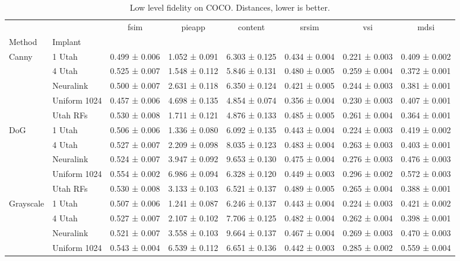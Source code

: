 \begin{table}
\caption{Low level fidelity on COCO. Distances, lower is better.}
\label{tab:low_coco}
\begin{tabular}{llcccccc}
\toprule
 &  & fsim & pieapp & content & srsim & vsi & mdsi \\
Method & Implant &  &  &  &  &  &  \\
\midrule
\multirow[t]{5}{*}{Canny} & 1 Utah & 0.499 ± 0.006 & 1.052 ± 0.091 & 6.303 ± 0.125 & 0.434 ± 0.004 & 0.221 ± 0.003 & 0.409 ± 0.002 \\
 & 4 Utah & 0.525 ± 0.007 & 1.548 ± 0.112 & 5.846 ± 0.131 & 0.480 ± 0.005 & 0.259 ± 0.004 & 0.372 ± 0.001 \\
 & Neuralink & 0.500 ± 0.007 & 2.631 ± 0.118 & 6.350 ± 0.124 & 0.421 ± 0.005 & 0.244 ± 0.003 & 0.381 ± 0.001 \\
 & Uniform 1024 & 0.457 ± 0.006 & 4.698 ± 0.135 & 4.854 ± 0.074 & 0.356 ± 0.004 & 0.230 ± 0.003 & 0.407 ± 0.001 \\
 & Utah RFs & 0.530 ± 0.008 & 1.711 ± 0.121 & 4.876 ± 0.133 & 0.485 ± 0.005 & 0.261 ± 0.004 & 0.364 ± 0.001 \\
\cline{1-8}
\multirow[t]{5}{*}{DoG} & 1 Utah & 0.506 ± 0.006 & 1.336 ± 0.080 & 6.092 ± 0.135 & 0.443 ± 0.004 & 0.224 ± 0.003 & 0.419 ± 0.002 \\
 & 4 Utah & 0.527 ± 0.007 & 2.209 ± 0.098 & 8.035 ± 0.123 & 0.483 ± 0.004 & 0.263 ± 0.003 & 0.403 ± 0.001 \\
 & Neuralink & 0.524 ± 0.007 & 3.947 ± 0.092 & 9.653 ± 0.130 & 0.475 ± 0.004 & 0.276 ± 0.003 & 0.476 ± 0.003 \\
 & Uniform 1024 & 0.554 ± 0.002 & 6.986 ± 0.094 & 6.328 ± 0.120 & 0.449 ± 0.003 & 0.296 ± 0.002 & 0.572 ± 0.003 \\
 & Utah RFs & 0.530 ± 0.008 & 3.133 ± 0.103 & 6.521 ± 0.137 & 0.489 ± 0.005 & 0.265 ± 0.004 & 0.388 ± 0.001 \\
\cline{1-8}
\multirow[t]{5}{*}{Grayscale} & 1 Utah & 0.507 ± 0.006 & 1.241 ± 0.087 & 6.246 ± 0.137 & 0.443 ± 0.004 & 0.224 ± 0.003 & 0.421 ± 0.002 \\
 & 4 Utah & 0.527 ± 0.007 & 2.107 ± 0.102 & 7.706 ± 0.125 & 0.482 ± 0.004 & 0.262 ± 0.004 & 0.398 ± 0.001 \\
 & Neuralink & 0.521 ± 0.007 & 3.558 ± 0.103 & 9.664 ± 0.137 & 0.467 ± 0.004 & 0.269 ± 0.003 & 0.470 ± 0.003 \\
 & Uniform 1024 & 0.543 ± 0.004 & 6.539 ± 0.112 & 6.651 ± 0.136 & 0.442 ± 0.003 & 0.285 ± 0.002 & 0.559 ± 0.004 \\

\end{tabular}
\end{table}
